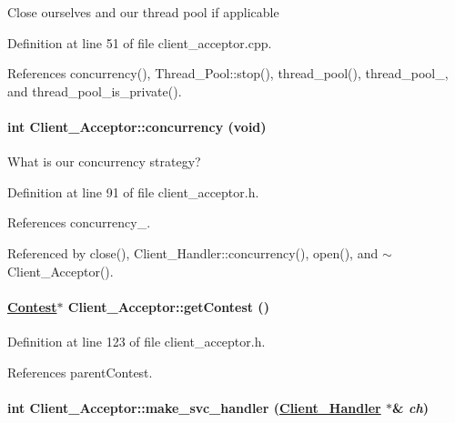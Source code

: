 Close ourselves and our thread pool if applicable 

Definition at line 51 of file client\_\-acceptor.cpp.

References concurrency(), Thread\_\-Pool::stop(), thread\_\-pool(), thread\_\-pool\_\-, and thread\_\-pool\_\-is\_\-private().\hypertarget{classClient__Acceptor_Client__Acceptora5}{
\paragraph[concurrency]{\setlength{\rightskip}{0pt plus 5cm}int Client\_\-Acceptor::concurrency (void)}\hfill}
\label{classClient__Acceptor_Client__Acceptora5}


What is our concurrency strategy? 

Definition at line 91 of file client\_\-acceptor.h.

References concurrency\_\-.

Referenced by close(), Client\_\-Handler::concurrency(), open(), and $\sim$Client\_\-Acceptor().\hypertarget{classClient__Acceptor_Client__Acceptora10}{
\paragraph[getContest]{\setlength{\rightskip}{0pt plus 5cm}\hyperlink{classContest}{Contest}$\ast$ Client\_\-Acceptor::get\-Contest ()}\hfill}
\label{classClient__Acceptor_Client__Acceptora10}




Definition at line 123 of file client\_\-acceptor.h.

References parent\-Contest.\hypertarget{classClient__Acceptor_Client__Acceptora8}{
\paragraph[make\_\-svc\_\-handler]{\setlength{\rightskip}{0pt plus 5cm}int Client\_\-Acceptor::make\_\-svc\_\-handler (\hyperlink{classClient__Handler}{Client\_\-Handler} $\ast$\& {\em ch})}\hfill}
\label{classClient__Acceptor_Client__Acceptora8}


